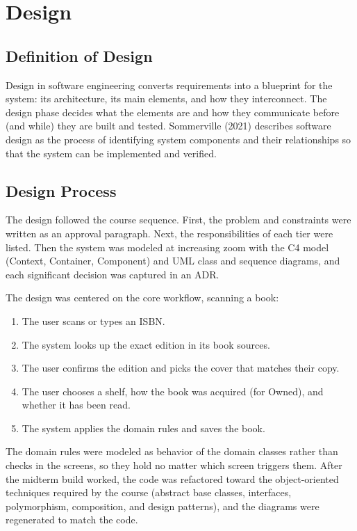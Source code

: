 \documentclass[12pt]{article}
\begin{document}
\section{Design}

\subsection{Definition of Design}

Design in software engineering converts requirements into a blueprint for the system: its architecture, its main elements, and how they interconnect. The design phase decides what the elements are and how they communicate before (and while) they are built and tested. Sommerville (2021) describes software design as the process of identifying system components and their relationships so that the system can be implemented and verified.

\subsection{Design Process}

The design followed the course sequence. First, the problem and constraints were written as an approval paragraph. Next, the responsibilities of each tier were listed. Then the system was modeled at increasing zoom with the C4 model (Context, Container, Component) and UML class and sequence diagrams, and each significant decision was captured in an ADR.

The design was centered on the core workflow, scanning a book:
\begin{enumerate}
    \item The user scans or types an ISBN.
    \item The system looks up the exact edition in its book sources.
    \item The user confirms the edition and picks the cover that matches their copy.
    \item The user chooses a shelf, how the book was acquired (for Owned), and whether it has been read.
    \item The system applies the domain rules and saves the book.
\end{enumerate}

The domain rules were modeled as behavior of the domain classes rather than checks in the screens, so they hold no matter which screen triggers them. After the midterm build worked, the code was refactored toward the object-oriented techniques required by the course (abstract base classes, interfaces, polymorphism, composition, and design patterns), and the diagrams were regenerated to match the code.
\end{document}
